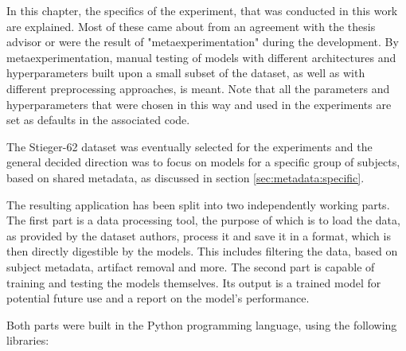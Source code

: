 \documentclass[english, he, bc, kiv, iso690alph, viewonly]{fasthesis}
\begin{document}
In this chapter, the specifics of the experiment, that was conducted in this work are explained. Most of these came about from an agreement with the thesis advisor or were the result of "metaexperimentation" during the development. By metaexperimentation, manual testing of models with different architectures and hyperparameters built upon a small subset of the dataset, as well as with different preprocessing approaches, is meant. Note that all the parameters and hyperparameters that were chosen in this way and used in the experiments are set as defaults in the associated code.

The Stieger-62 dataset was eventually selected for the experiments and the general decided direction was to focus on models for a specific group of subjects, based on shared metadata, as discussed in section \ref{sec:metadata:specific}.

The resulting application has been split into two independently working parts. The first part is a data processing tool, the purpose of which is to load the data, as provided by the dataset authors, process it and save it in a format, which is then directly digestible by the models. This includes filtering the data, based on subject metadata, artifact removal and more. The second part is capable of training and testing the models themselves. Its output is a trained model for potential future use and a report on the model's performance.

Both parts were built in the Python programming language, using the following libraries:
\end{document}
